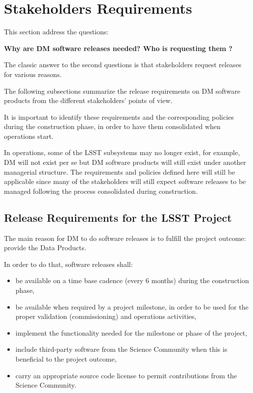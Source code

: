 \section{Stakeholders Requirements} \label{sec:reqs}

This section address the questions:

\textbf{Why are DM software releases needed? Who is requesting them ?}

The classic answer to the second questions is that  stakeholders request releases for various reasons.

The following subsections summarize the release requirements on \gls{DM} software products from the different stakeholders' points of view.

It is important to identify these requirements and the corresponding policies during the construction phase, in order to have them consolidated when operations start.

In operations, some of the \gls{LSST} subsystems may no longer exist, for example, \gls{DM} will not exist per se but \gls{DM} software products will still exist under another managerial structure.
The requirements and policies defined here will still be applicable since many of the stakeholders will still expect software releases to be managed following the process consolidated during construction.


\subsection{Release Requirements for the \gls{LSST} Project} \label{sec:comreqs}

The main reason for DM to do software releases is to fulfill the project outcome: provide the Data Products.

In order to do that, software releases shall:

\begin{itemize}
\item be available on a time base cadence (every 6 months) during the construction phase,
\item be available when required by a project milestone, in order to be used for the proper validation (commissioning) and operations activities,
\item implement the  functionality needed for the milestone or phase of the project,
\item include third-party software from the Science Community when this is beneficial to the project outcome,
\item carry an appropriate source code license to permit contributions from the Science Community.
\end{itemize}


